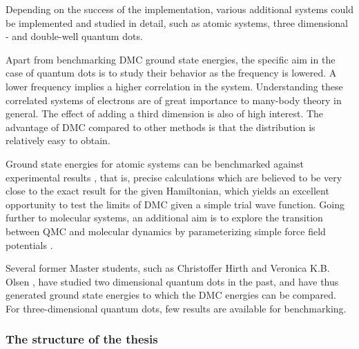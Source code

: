 Depending on the success of the implementation, various additional systems could be implemented and studied in detail, such as atomic systems, three dimensional - and double-well quantum dots. 

Apart from benchmarking DMC ground state energies, the specific aim in the case of quantum dots is to study their behavior as the frequency is lowered. A lower frequency implies a higher correlation in the system. Understanding these correlated systems of electrons are of great importance to many-body theory in general. The effect of adding a third dimension is also of high interest. The advantage of DMC compared to other methods is that the distribution is relatively easy to obtain.

Ground state energies for atomic systems can be benchmarked against experimental results \cite{H_He_exact, ExactMolecules, AtomsExact, KryptonExact}, that is, precise calculations which are believed to be very close to the exact result for the given Hamiltonian, which yields an excellent opportunity to test the limits of DMC given a simple trial wave function. Going further to molecular systems, an additional aim is to explore the transition between QMC and molecular dynamics by parameterizing simple force field potentials \cite{forcesQMC}.

Several former Master students, such as Christoffer Hirth \cite{Hirth} and Veronica K.B. Olsen \cite{Olsen}, have studied two dimensional quantum dots in the past, and have thus generated ground state energies to  which the DMC energies can be compared. For three-dimensional quantum dots, few results are available for benchmarking.

\subsubsection{The structure of the thesis}

